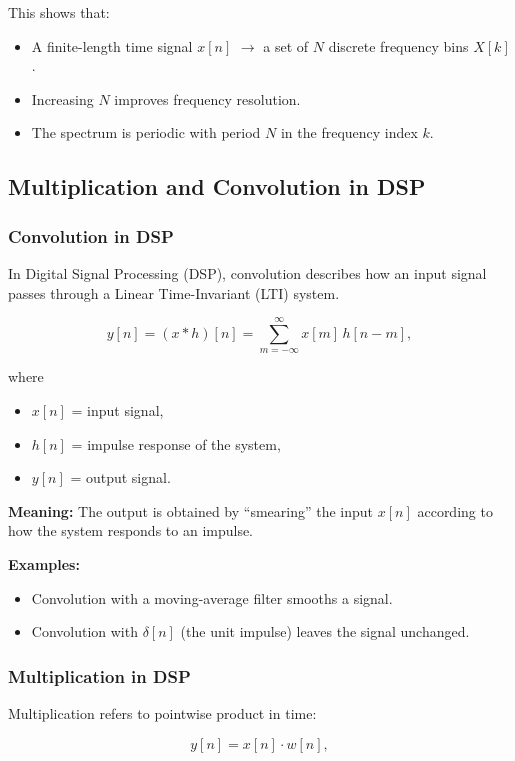 \documentclass[a4paper,12pt]{article}
\begin{document}
This shows that:
\begin{itemize}
    \item A finite-length time signal $x[n]$ $\to$ a set of $N$ discrete frequency bins $X[k]$.
    \item Increasing $N$ improves frequency resolution.
    \item The spectrum is periodic with period $N$ in the frequency index $k$.
\end{itemize}

\subsection{Multiplication and Convolution in DSP}

\subsubsection{Convolution in DSP}

In Digital Signal Processing (DSP), convolution describes how an input signal passes through a Linear Time-Invariant (LTI) system.

\[
y[n] = (x * h)[n] = \sum_{m=-\infty}^{\infty} x[m] \, h[n-m],
\]

where
\begin{itemize}
    \item $x[n]$ = input signal,
    \item $h[n]$ = impulse response of the system,
    \item $y[n]$ = output signal.
\end{itemize}

\textbf{Meaning:} The output is obtained by ``smearing'' the input $x[n]$ according to how the system responds to an impulse.

\textbf{Examples:}
\begin{itemize}
    \item Convolution with a moving-average filter smooths a signal.
    \item Convolution with $\delta[n]$ (the unit impulse) leaves the signal unchanged.
\end{itemize}


\subsubsection{Multiplication in DSP}

Multiplication refers to pointwise product in time:

\[
y[n] = x[n] \cdot w[n],
\]
\end{document}
